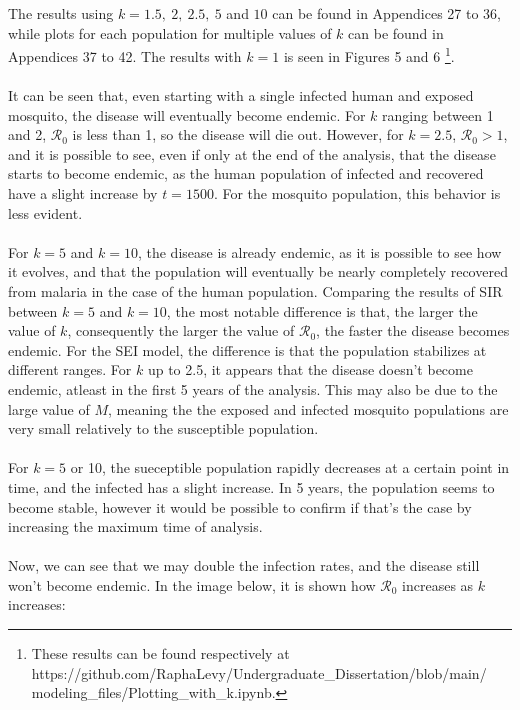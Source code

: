 The results using $k=1.5, \ 2, \ 2.5, \ 5$ and $10$ can be found in Appendices 
27 to 36, while plots for each population for multiple values 
of $k$ can be found in Appendices 37 to 42. The results with $k=1$ 
is seen in Figures 5 and 6 \footnote{These results can be found respectively at
https://github.com/RaphaLevy/Undergraduate\_Dissertation/blob/main/
\\modeling\_files/Plotting\_with\_k.ipynb.}.
\\\\
It can be seen that, even starting with a single infected 
human and exposed mosquito,
the disease will eventually become endemic. For $k$ ranging between 1 and 2,
$\mathcal{R}_0$ is less than 1, so the disease will die out. However, for $k=2.5$, 
$\mathcal{R}_0>1$, and it is possible to see, even if only at the end of the analysis, that the disease 
starts to become endemic, as the human population of infected and recovered 
have a slight increase by $t=1500$. For the mosquito population, this 
behavior is less evident.
\\\\
For $k=5$ and $k=10$, the disease is already endemic, as it is possible to see
how it evolves, and that the population will eventually be nearly completely 
recovered from malaria in the case of the human population. Comparing the results 
of SIR between $k=5$ and $k=10$, the most notable difference is that, the larger 
the value of $k$, consequently the larger the value of $\mathcal{R}_0$, 
the faster the disease becomes endemic. For the SEI model, the difference 
is that the population stabilizes at different ranges. For $k$ up to 2.5, 
it appears that the disease doesn't become endemic, atleast in the first 5 years 
of the analysis. This may also be due to the large value of $M$, meaning the the exposed and 
infected mosquito populations are very small relatively to the susceptible population.
\\\\
For $k=5$ or 10, the sueceptible population rapidly decreases at 
a certain point in time, and the infected has a slight increase. In 5 years,
the population seems to become stable, however it would be possible to confirm 
if that's the case by increasing the maximum time of analysis.
\\\\
Now, we can see that we may double the infection rates, and the disease still 
won't become endemic. In the image below, it is shown how $\mathcal{R}_0$ 
increases as $k$ increases:
